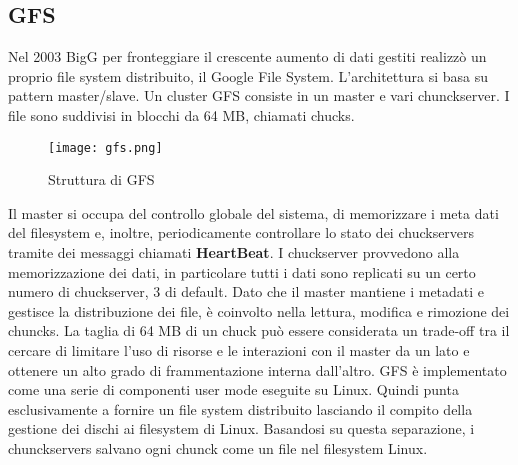 \subsection{GFS}
Nel 2003 BigG per fronteggiare il crescente aumento di dati gestiti realizzò un proprio file system distribuito, il Google File System. L'architettura si basa su pattern master/slave. Un cluster GFS consiste in un master e vari chunckserver. I file sono suddivisi in blocchi da 64 MB, chiamati chucks.
\begin{figure}[H]
  \begin{center}
    \texttt{[image: gfs.png]}
    \caption{Struttura di GFS}
    \label{fg:gfs.png}
  \end{center}
\end{figure}
Il master si occupa del controllo globale del sistema, di memorizzare i meta dati del filesystem e, inoltre, periodicamente controllare lo stato dei chuckservers tramite dei messaggi chiamati \textbf{HeartBeat}. I chuckserver provvedono alla memorizzazione dei dati, in particolare tutti i dati sono replicati su un certo numero di chuckserver, 3 di default. 
Dato che il master mantiene i metadati e gestisce la distribuzione dei file, è coinvolto nella lettura, modifica e rimozione dei chuncks. La taglia di 64 MB di un chuck può essere considerata un trade-off tra il cercare di limitare l'uso di risorse e le interazioni con il master da un lato e ottenere un alto grado di frammentazione interna dall'altro. GFS è implementato come una serie di componenti user mode eseguite su Linux. Quindi punta esclusivamente a fornire un file system distribuito lasciando il compito della gestione dei dischi ai filesystem di Linux. Basandosi su questa separazione, i chunckservers salvano ogni chunck come un file nel filesystem Linux.\cite{ghemawat03}
